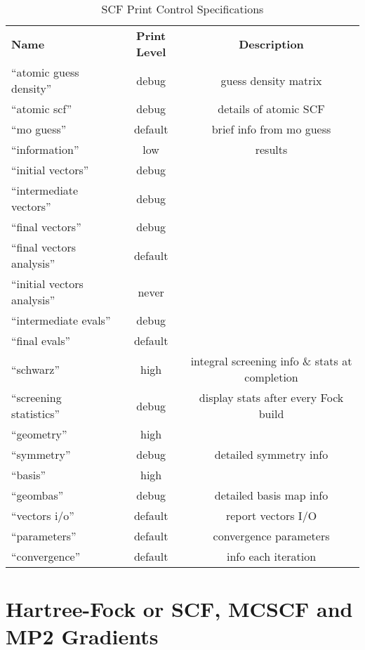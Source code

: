 \begin{table}[htbp]
\begin{center}
\begin{tabular}{lcc}
  {\bf Name}          & {\bf Print Level} & {\bf Description} \\
 ``atomic guess density''     & debug     & guess density matrix \\
 ``atomic scf''               & debug     & details of atomic SCF \\
 ``mo guess''                 & default   & brief info from mo guess \\
 ``information''              & low       & results  \\
 ``initial vectors''          & debug     & \\
 ``intermediate vectors''     & debug     & \\
 ``final vectors''            & debug     & \\
 ``final vectors analysis''   & default   & \\
 ``initial vectors analysis'' & never     & \\
 ``intermediate evals''       & debug     & \\
 ``final evals''              & default   & \\
 ``schwarz''                  & high      & integral screening info \& stats at completion\\
 ``screening statistics''     & debug     & display stats after every Fock build \\
 ``geometry''                 & high      & \\
 ``symmetry''                 & debug     & detailed symmetry info \\
 ``basis''                    & high      & \\
 ``geombas''                  & debug     & detailed basis map info \\
 ``vectors i/o''              & default   & report vectors I/O \\
 ``parameters''               & default   & convergence parameters \\
 ``convergence''              & default   & info each iteration
\end{tabular}
\end{center}
\caption{SCF Print Control Specifications}
\end{table}

\newpage
\section{Hartree-Fock or SCF, MCSCF and MP2 Gradients}



